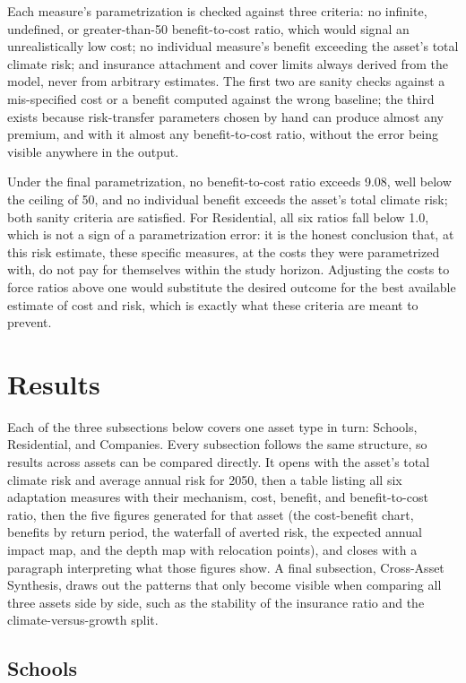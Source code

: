 \documentclass[11pt]{article}
\begin{document}
Each measure's parametrization is checked against three criteria: no infinite, undefined,
or greater-than-50 benefit-to-cost ratio, which would signal an unrealistically low cost;
no individual measure's benefit exceeding the asset's total climate risk; and insurance
attachment and cover limits always derived from the model, never from arbitrary estimates.
The first two are sanity checks against a mis-specified cost or a benefit computed against
the wrong baseline; the third exists because risk-transfer parameters chosen by hand can
produce almost any premium, and with it almost any benefit-to-cost ratio, without the error
being visible anywhere in the output.

Under the final parametrization, no benefit-to-cost ratio exceeds 9.08, well below the
ceiling of 50, and no individual benefit exceeds the asset's total climate risk; both
sanity criteria are satisfied. For Residential, all six ratios fall below 1.0, which is not
a sign of a parametrization error: it is the honest conclusion that, at this risk estimate,
these specific measures, at the costs they were parametrized with, do not pay for
themselves within the study horizon. Adjusting the costs to force ratios above one would
substitute the desired outcome for the best available estimate of cost and risk, which is
exactly what these criteria are meant to prevent.

\section{Results}
\label{sec:results}

Each of the three subsections below covers one asset type in turn: Schools, Residential,
and Companies. Every subsection follows the same structure, so results across assets can
be compared directly. It opens with the asset's total climate risk and average annual
risk for 2050, then a table listing all six adaptation measures with their mechanism,
cost, benefit, and benefit-to-cost ratio, then the five figures generated for that asset
(the cost-benefit chart, benefits by return period, the waterfall of averted risk, the
expected annual impact map, and the depth map with relocation points), and closes with a
paragraph interpreting what those figures show. A final subsection, Cross-Asset Synthesis,
draws out the patterns that only become visible when comparing all three assets side by
side, such as the stability of the insurance ratio and the climate-versus-growth split.

\subsection{Schools}
\end{document}
